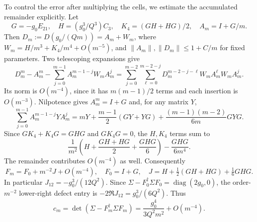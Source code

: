 \documentclass[11pt,a4paper]{article}
\theoremstyle{remark}
\newcommand{\norm}[1]{\lVert #1\rVert}
\newcommand{\diag}{\operatorname{diag}}
\begin{document}
To control the error after multiplying the cells, we estimate the accumulated remainder explicitly. Let
\[
 G=-g_0E_{21},\quad H=(g_0^3/Q^3)C_3,\quad K_4=(GH+HG)/2,\quad
 A_m=I+G/m.
\]
Then $D_m:=D(g_0/(Qm))=A_m+W_m$, where $W_m=H/m^3+K_4/m^4+O(m^{-5})$, and $\norm{A_m},\norm{D_m}\leq1+C/m$ for fixed parameters. Two telescoping expansions give
\[
 D_m^m-A_m^m-\sum_{j=0}^{m-1}A_m^{m-1-j}W_mA_m^j
 =\sum_{j=0}^{m-2}\sum_{\ell=0}^{m-2-j}
 D_m^{m-2-j-\ell}W_mA_m^\ell W_mA_m^j.
\]
Its norm is $O(m^{-4})$, since it has $m(m-1)/2$ terms and each insertion is $O(m^{-3})$. Nilpotence gives $A_m^m=I+G$ and, for any matrix $Y$,
\[
 \sum_{j=0}^{m-1}A_m^{m-1-j}YA_m^j
 =mY+\frac{m-1}{2}(GY+YG)
  +\frac{(m-1)(m-2)}{6m}GYG.
\]
Since $GK_4+K_4G=GHG$ and $GK_4G=0$, the $H,K_4$ terms sum to
\[
 \frac1{m^2}\left(H+\frac{GH+HG}{2}+\frac{GHG}{6}\right)
 -\frac{GHG}{6m^4}.
\]
The remainder contributes $O(m^{-4})$ as well. Consequently
\begin{equation}\label{eq:Fm}
 F_m=F_0+m^{-2}J+O(m^{-4}),\quad
 F_0=I+G,\quad J=H+\tfrac12(GH+HG)+\tfrac16GHG.
\end{equation}
In particular $J_{12}=-g_0^3/(12Q^2)$. Since $\Sigma-F_0^\dagger\Sigma F_0=\diag(2g_0,0)$, the order-$m^{-2}$ lower-right defect entry is $-2\Re J_{12}=g_0^3/(6Q^2)$. Thus
\begin{equation}\label{eq:cm}
 c_m=\det(\Sigma-F_m^\dagger\Sigma F_m)
 =\frac{g_0^4}{3Q^2m^2}+O(m^{-4}).
\end{equation}
\end{document}
